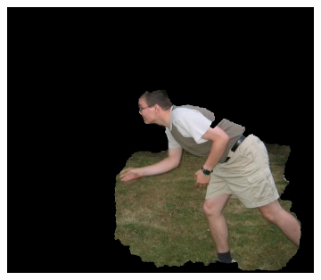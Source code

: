 \documentclass[a4paper,11]{article}
\begin{document}
\begin{center}
\begin{figure}[H]
\begin{subfigure}{0.33\textwidth}
      \includegraphics[width=0.9\linewidth]{results/bool}
    \end{subfigure}\\
      \vspace{1em}
      

\end{figure}
\end{center}
\end{document}
